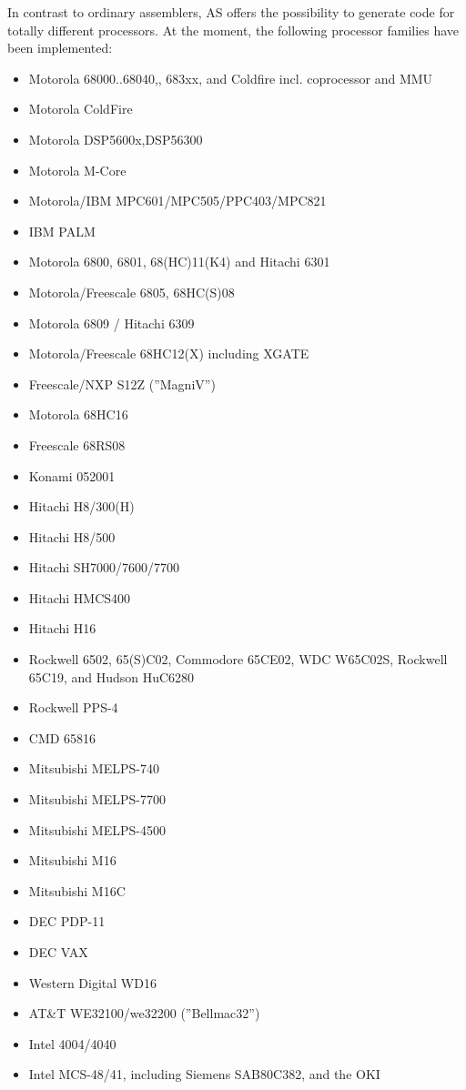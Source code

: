 \documentclass[12pt,twoside]{report}
\newcommand{\asname}{{AS}}
\begin{document}
In contrast to ordinary assemblers, \asname{} offers the possibility to
generate code for totally different processors.  At the moment, the
following processor families have been implemented:
\begin{itemize}
\item{Motorola 68000..68040,, 683xx, and Coldfire incl. coprocessor and MMU}
\item{Motorola ColdFire}
\item{Motorola DSP5600x,DSP56300}\item{Motorola M-Core}
\item{Motorola/IBM MPC601/MPC505/PPC403/MPC821}
\item{IBM PALM}
\item{Motorola 6800, 6801, 68(HC)11(K4) and Hitachi 6301}
\item{Motorola/Freescale 6805, 68HC(S)08}
\item{Motorola 6809 / Hitachi 6309}
\item{Motorola/Freescale 68HC12(X) including XGATE}
\item{Freescale/NXP S12Z (''MagniV'')}
\item{Motorola 68HC16}
\item{Freescale 68RS08}
\item{Konami 052001}
\item{Hitachi H8/300(H)}
\item{Hitachi H8/500}
\item{Hitachi SH7000/7600/7700}
\item{Hitachi HMCS400}
\item{Hitachi H16}
\item{Rockwell 6502, 65(S)C02, Commodore 65CE02, WDC W65C02S, Rockwell 65C19, and
      Hudson HuC6280}
\item{Rockwell PPS-4}
\item{CMD 65816}
\item{Mitsubishi MELPS-740}
\item{Mitsubishi MELPS-7700}
\item{Mitsubishi MELPS-4500}
\item{Mitsubishi M16}
\item{Mitsubishi M16C}
\item{DEC PDP-11}
\item{DEC VAX}
\item{Western Digital WD16}
\item{AT\&T WE32100/we32200 (''Bellmac32'')}
\item{Intel 4004/4040}
\item{Intel MCS-48/41, including Siemens SAB80C382, and the OKI
}
\end{itemize}
\end{document}
